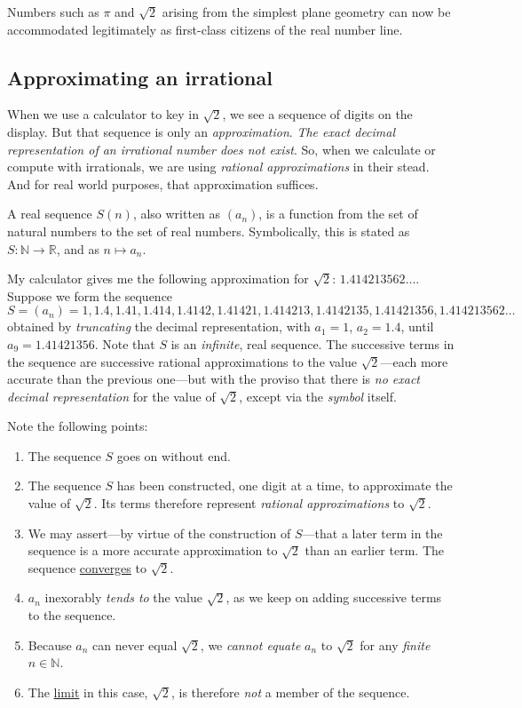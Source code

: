 \documentclass[
  a4paper,
]{article}
\begin{document}
Numbers such as \(\pi\) and \(\sqrt{2}\) arising from the simplest plane
geometry can now be accommodated legitimately as first-class citizens of
the real number line.

\subsection{Approximating an
irrational}\label{approximating-an-irrational}

When we use a calculator to key in \(\sqrt{2}\), we see a sequence of
digits on the display. But that sequence is only an
\emph{approximation}. \emph{The exact decimal representation of an
irrational number does not exist}. So, when we calculate or compute with
irrationals, we are using \emph{rational approximations} in their stead.
And for real world purposes, that approximation suffices.

A real sequence \(S(n)\), also written as \((a_{n})\), is a function
from the set of natural numbers to the set of real numbers.
Symbolically, this is stated as \(S: \mathbb{N} \to \mathbb{R}\), and as
\(n \mapsto a_{n}\).

My calculator gives me the following approximation for \(\sqrt{2}\):
\(1.414213562\dots\). Suppose we form the sequence \[
S = (a_n) = 1, 1.4, 1.41, 1.414, 1.4142, 1.41421, 1.414213, 1.4142135, 1.41421356, 1.414213562 \dots
\] obtained by \emph{truncating} the decimal representation, with
\(a_{1} = 1\), \(a_{2} = 1.4\), until \(a_{9} = 1.41421356\). Note that
\(S\) is an \emph{infinite}, real sequence. The successive terms in the
sequence are successive rational approximations to the value
\(\sqrt{2}\)---each more accurate than the previous one---but with the
proviso that there is \emph{no exact decimal representation} for the
value of \(\sqrt{2}\), except via the \emph{symbol} itself.

Note the following points:

\begin{enumerate}
\item
  The sequence \(S\) goes on without end.
\item
  The sequence \(S\) has been constructed, one digit at a time, to
  approximate the value of \(\sqrt{2}\). Its terms therefore represent
  \emph{rational approximations} to \(\sqrt{2}\).
\item
  We may assert---by virtue of the construction of \(S\)---that a later
  term in the sequence is a more accurate approximation to \(\sqrt{2}\)
  than an earlier term. The sequence
  \href{https://en.wikipedia.org/wiki/Convergent_series}{converges} to
  \(\sqrt{2}\).
\item
  \(a_{n}\) inexorably \emph{tends to} the value \(\sqrt{2}\), as we
  keep on adding successive terms to the sequence.
\item
  Because \(a_{n}\) can never equal \(\sqrt{2}\), we \emph{cannot
  equate} \(a_{n}\) to \(\sqrt{2}\) for any \emph{finite}
  \(n \in \mathbb{N}\).
\item
  The \href{https://en.wikipedia.org/wiki/Limit_(mathematics)}{limit} in
  this case, \(\sqrt{2}\), is therefore \emph{not} a member of the
  sequence.
\end{enumerate}
\end{document}

